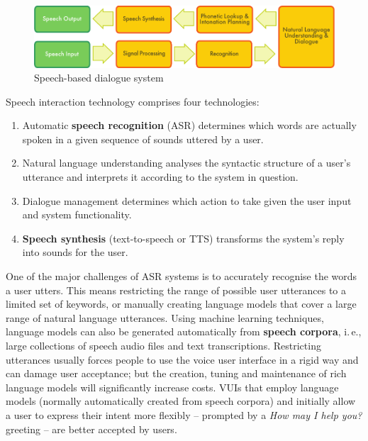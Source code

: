 \begin{multicols}{2}
\begin{figure}[htb]
  \center
  \includegraphics[width=\textwidth]{../_media/english/simple_speech-based_dialogue_architecture}
  \caption{Speech-based dialogue system}
  \label{fig:dialoguearch_en}
\end{figure}

Speech interaction technology comprises four technologies: 

\begin{enumerate}
\item Automatic \textbf{speech recognition} (ASR) determines which words are actually spoken in a given sequence of sounds uttered by a user.  
\item Natural language understanding analyses the syntactic structure of a user’s utterance and interprets it according to the system in question.
\item Dialogue management determines which action to take given the user input and system functionality.   
\item \textbf{Speech synthesis} (text-to-speech or TTS) transforms the system’s reply into sounds for the user.
\end{enumerate}

One of the major challenges of ASR systems is to accurately recognise the words a user utters. This means restricting the range of possible user utterances to a limited set of keywords, or manually creating language models that cover a large range of natural language utterances. Using machine learning techniques, language models can also be generated automatically from \textbf{speech corpora}, i.\,e., large collections of speech audio files and text transcriptions. Restricting utterances usually forces people to use the voice user interface in a rigid way and can damage user acceptance; but the creation, tuning and maintenance of rich language models will significantly increase costs. VUIs that employ language models (normally automatically created from speech corpora) and initially allow a user to express their intent more flexibly -- prompted by a \textit{How may I help you?} greeting -- are better accepted by users.


\end{multicols}
